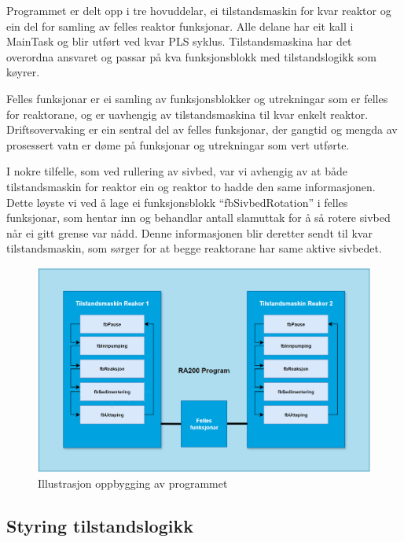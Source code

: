 Programmet er delt opp i tre hovuddelar, ei tilstandsmaskin for kvar reaktor og ein del for samling av felles reaktor funksjonar.
Alle delane har eit kall i MainTask og blir utført ved kvar \gls{PLS} syklus. Tilstandsmaskina har det overordna ansvaret og passar på kva 
funksjonsblokk med tilstandslogikk som køyrer.

Felles funksjonar er ei samling av funksjonsblokker og utrekningar som er felles for reaktorane, og er uavhengig av tilstandsmaskina til kvar enkelt reaktor.
Driftsovervaking er ein sentral del av felles funksjonar, der gangtid og mengda av prosessert vatn er døme på funksjonar og utrekningar som vert utførte.

I nokre tilfelle, som ved rullering av sivbed, var vi avhengig av at både tilstandsmaskin for reaktor ein og reaktor to hadde den same informasjonen.
Dette løyste vi ved å lage ei funksjonsblokk ``fbSivbedRotation'' i felles funksjonar, som hentar inn og behandlar antall slamuttak for å så rotere sivbed når ei gitt grense var nådd.
Denne informasjonen blir deretter sendt til kvar tilstandsmaskin, som sørger for at begge reaktorane har same aktive sivbedet.

\begin{figure}[htbp]
    \centering
    \includegraphics[width=1\textwidth]{Figurar/Oppbygging_Program.png}
    \caption{Illustrasjon oppbygging av programmet}\label{fig:OppbyggingProgram}
\end{figure}

\newpage

\subsection{Styring tilstandslogikk}

